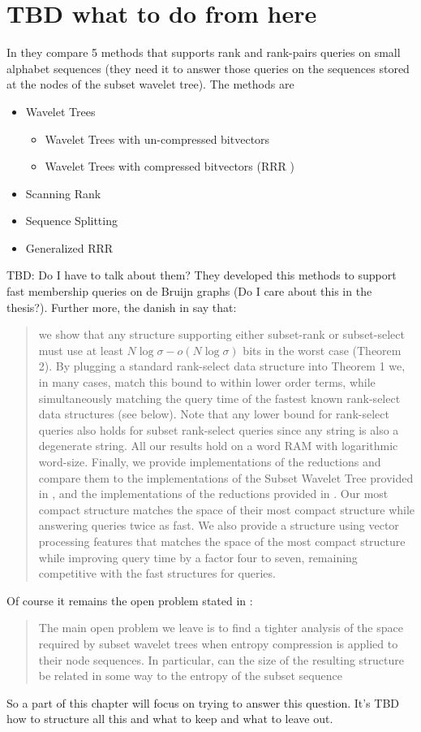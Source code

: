 \section{TBD what to do from here}
In \cite{SubsetWT} they compare 5 methods that supports rank and rank-pairs queries on small alphabet sequences (they need it to answer those queries on the sequences stored at the nodes of the subset wavelet tree). The methods are
\begin{itemize}
    \item Wavelet Trees
          \begin{itemize}
              \item Wavelet Trees with un-compressed bitvectors
              \item Wavelet Trees with compressed bitvectors (RRR \cite{RRR2002})
          \end{itemize}
    \item Scanning Rank
    \item Sequence Splitting
    \item Generalized RRR
\end{itemize}
TBD: Do I have to talk about them? They developed this methods to support fast membership queries on de Bruijn graphs (Do I care about this in the thesis?). Further more, the danish in \cite{bille2023rank} say that:
\begin{quote}
    we show that any structure supporting either subset-rank or subset-select must use at least $N \log \sigma - o(N \log \sigma)$ bits in the worst case (Theorem 2). By plugging a standard rank-select data structure into Theorem 1 we, in many cases, match this bound to within lower order terms, while simultaneously matching the query time of the fastest known rank-select data structures (see below). Note that any lower bound for rank-select queries also holds for subset rank-select queries since any string is also a degenerate string. All our results hold on a word RAM with logarithmic word-size. Finally, we provide implementations of the reductions and compare them to the implementations of the Subset Wavelet Tree provided in \cite{SubsetWT}, and the implementations of the reductions provided in \cite{alanko2023small}. Our most compact structure matches the space of their most compact structure while answering queries twice as fast. We also provide a structure using vector processing features that matches the space of the most compact structure while improving query time by a factor four to seven, remaining competitive with the fast structures for queries.
\end{quote}
Of course it remains the open problem stated in \cite{SubsetWT}:
\begin{quote}
    The main open problem we leave is to find a tighter analysis of the space required by subset wavelet trees when entropy compression is applied to their node sequences. In particular, can the size of the resulting structure be related in some way to the entropy of the subset sequence
\end{quote}
So a part of this chapter will focus on trying to answer this question. It's TBD how to structure all this and what to keep and what to leave out.
